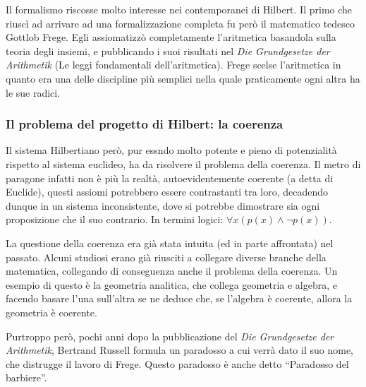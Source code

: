 \documentclass[a4paper,10pt]{article}
\begin{document}
Il formalismo riscosse molto interesse nei contemporanei di Hilbert. Il primo che riuscì ad arrivare ad una formalizzazione completa fu però il matematico tedesco Gottlob Frege. Egli assiomatizzò completamente l'aritmetica basandola sulla teoria degli insiemi, e pubblicando i suoi risultati nel \textit{Die Grundgesetze der Arithmetik} (Le leggi fondamentali dell'aritmetica). Frege scelse l'aritmetica in quanto era una delle discipline più semplici nella quale praticamente ogni altra ha le sue radici.

\subsubsection[Il problema coerenza]{Il problema del progetto di Hilbert: la coerenza}
Il sistema Hilbertiano però, pur essndo molto potente e pieno di potenzialità rispetto al sistema euclideo, ha da risolvere il problema della coerenza. Il metro di paragone infatti non è più la realtà, autoevidentemente coerente (a detta di Euclide), questi assiomi potrebbero essere contrastanti tra loro, decadendo dunque in un sistema inconsistente, dove si potrebbe dimostrare sia ogni proposizione che il suo contrario. In termini logici: $ \forall x (p(x)\wedge\neg p(x))$.

La questione della coerenza era già stata intuita (ed in parte affrontata) nel passato. Alcuni studiosi erano già riusciti a collegare diverse branche della matematica, collegando di conseguenza anche il problema della coerenza. Un esempio di questo è la geometria analitica, che collega geometria e algebra, e facendo basare l'una sull'altra se ne deduce che, se l'algebra è coerente, allora la geometria è coerente.

Purtroppo però, pochi anni dopo la pubblicazione del \textit{Die Grundgesetze der Arithmetik}, Bertrand Russell formula un paradosso a cui verrà dato il suo nome, che distrugge il lavoro di Frege. Questo paradosso è anche detto “Paradosso del barbiere”.
\end{document}
